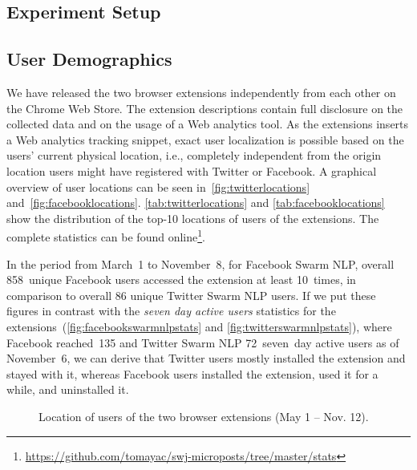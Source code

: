 \documentclass{iosart2c}
\begin{document}
\subsection{Experiment Setup}


\subsection{User Demographics}
We have released the two browser extensions independently from each other on the Chrome Web Store.
The extension descriptions contain full disclosure on the collected data and on the usage of a Web analytics tool.
As the extensions inserts a Web analytics tracking snippet, exact user localization is possible based on the users' current physical location, i.e., completely independent from the origin location users might have registered with Twitter or Facebook.
A graphical overview of user locations can be seen in~\autoref{fig:twitterlocations} and~\autoref{fig:facebooklocations}.
\autoref{tab:twitterlocations} and \autoref{tab:facebooklocations} show the distribution of the top-10 locations of users of the extensions.
The complete statistics can be found online\footnote{\url{https://github.com/tomayac/swj-microposts/tree/master/stats}}.

In the period from March~1 to November~8, for Facebook Swarm NLP, overall 858~unique Facebook users accessed the extension at least 10~times, in comparison to overall 86 unique Twitter Swarm NLP users.
If we put these figures in contrast with the \emph{seven day active users} statistics for the extensions~(\autoref{fig:facebookswarmnlpstats} and \autoref{fig:twitterswarmnlpstats}), where Facebook reached~135 and Twitter Swarm NLP 72~seven~day active users as of November~6, we can derive that Twitter users mostly installed the extension and stayed with it, whereas Facebook users installed the extension, used it for a while, and uninstalled it.

\begin{figure}
  \centering
    \qquad
\caption{Location of users of the two browser extensions (May 1 -- Nov. 12).}
\label{fig:location}
\end{figure}
\end{document}
